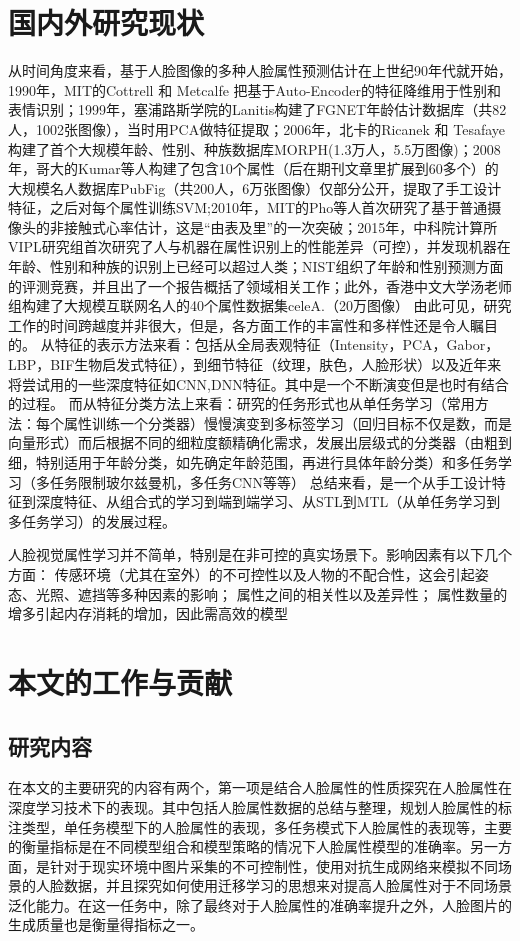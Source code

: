 \section{国内外研究现状}
从时间角度来看，基于人脸图像的多种人脸属性预测估计在上世纪90年代就开始，1990年，MIT的Cottrell 和 Metcalfe 把基于Auto-Encoder的特征降维用于性别和表情识别；1999年，塞浦路斯学院的Lanitis构建了FGNET年龄估计数据库（共82人，1002张图像），当时用PCA做特征提取；2006年，北卡的Ricanek 和 Tesafaye构建了首个大规模年龄、性别、种族数据库MORPH(1.3万人，5.5万图像)；2008年，哥大的Kumar等人构建了包含10个属性（后在期刊文章里扩展到60多个）的大规模名人数据库PubFig（共200人，6万张图像）仅部分公开，提取了手工设计特征，之后对每个属性训练SVM;2010年，MIT的Pho等人首次研究了基于普通摄像头的非接触式心率估计，这是“由表及里”的一次突破；2015年，中科院计算所VIPL研究组首次研究了人与机器在属性识别上的性能差异（可控），并发现机器在年龄、性别和种族的识别上已经可以超过人类；NIST组织了年龄和性别预测方面的评测竞赛，并且出了一个报告概括了领域相关工作；此外，香港中文大学汤老师组构建了大规模互联网名人的40个属性数据集celeA.（20万图像）
由此可见，研究工作的时间跨越度并非很大，但是，各方面工作的丰富性和多样性还是令人瞩目的。
从特征的表示方法来看：包括从全局表观特征（Intensity，PCA，Gabor， LBP，BIF生物启发式特征），到细节特征（纹理，肤色，人脸形状）以及近年来将尝试用的一些深度特征如CNN,DNN特征。其中是一个不断演变但是也时有结合的过程。
而从特征分类方法上来看：研究的任务形式也从单任务学习（常用方法：每个属性训练一个分类器）慢慢演变到多标签学习（回归目标不仅是数，而是向量形式）而后根据不同的细粒度额精确化需求，发展出层级式的分类器（由粗到细，特别适用于年龄分类，如先确定年龄范围，再进行具体年龄分类）和多任务学习（多任务限制玻尔兹曼机，多任务CNN等等）
总结来看，是一个从手工设计特征到深度特征、从组合式的学习到端到端学习、从STL到MTL（从单任务学习到多任务学习）的发展过程。

人脸视觉属性学习并不简单，特别是在非可控的真实场景下。影响因素有以下几个方面：
传感环境（尤其在室外）的不可控性以及人物的不配合性，这会引起姿态、光照、遮挡等多种因素的影响；
属性之间的相关性以及差异性；
属性数量的增多引起内存消耗的增加，因此需高效的模型

\section{本文的工作与贡献}
\subsection{研究内容}
在本文的主要研究的内容有两个，第一项是结合人脸属性的性质探究在人脸属性在深度学习技术下的表现。其中包括人脸属性数据的总结与整理，规划人脸属性的标注类型，单任务模型下的人脸属性的表现，多任务模式下人脸属性的表现等，主要的衡量指标是在不同模型组合和模型策略的情况下人脸属性模型的准确率。另一方面，是针对于现实环境中图片采集的不可控制性，使用对抗生成网络来模拟不同场景的人脸数据，并且探究如何使用迁移学习的思想来对提高人脸属性对于不同场景泛化能力。在这一任务中，除了最终对于人脸属性的准确率提升之外，人脸图片的生成质量也是衡量得指标之一。
